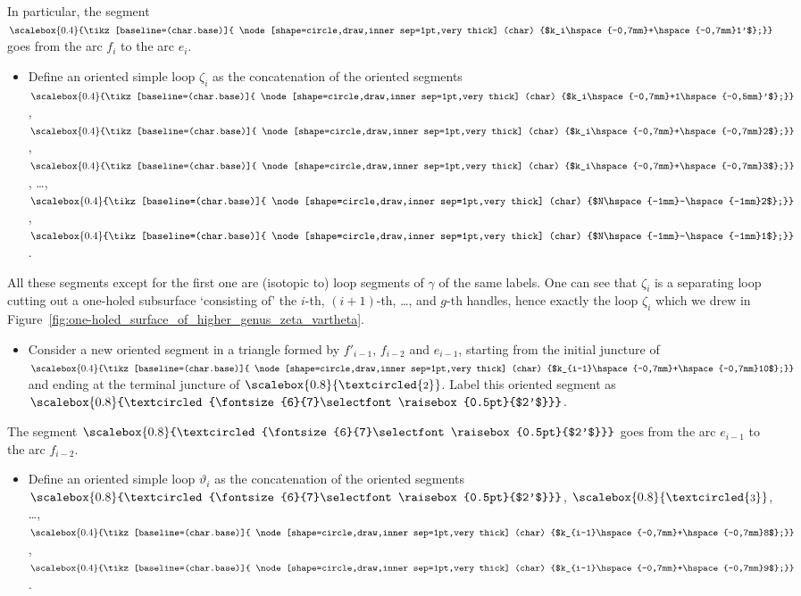 \documentclass[pdftex]{sigma}
\numberwithin{equation}{section}
\theoremstyle{definition}
\newcommand{\circled}[1]{\scalebox{0.8}{\textcircled{\fontsize{8}{9}\selectfont \raisebox{-0.1pt}{#1}}}}
\newcommand{\circledd}[1]{\scalebox{0.8}{\textcircled{\fontsize{6}{7}\selectfont \raisebox{0.5pt}{#1}}}}
\newcommand*\circleddd[1]{\scalebox{0.4}{\tikz[baseline=(char.base)]{
 \node[shape=circle,draw,inner sep=1pt,very thick] (char) {#1};}}}
\begin{document}
In particular, the segment $\circleddd{$k_i\hspace{-0,7mm}+\hspace{-0,7mm}1'$}$ goes from the arc $f_i$ to the arc $e_i$.
\begin{itemize}\itemsep=0pt
\item Define an oriented simple loop $\zeta_i$ as the concatenation of the oriented segments $\circleddd{$k_i\hspace{-0,7mm}+1\hspace{-0,5mm}'$}$, $\circleddd{$k_i\hspace{-0,7mm}+\hspace{-0,7mm}2$}$, $\circleddd{$k_i\hspace{-0,7mm}+\hspace{-0,7mm}3$}$, \dots, $\circleddd{$N\hspace{-1mm}-\hspace{-1mm}2$}$, $\circleddd{$N\hspace{-1mm}-\hspace{-1mm}1$}$.
\end{itemize}
All these segments except for the first one are (isotopic to) loop segments of $\gamma$ of the same labels. One can see that $\zeta_i$ is a separating loop cutting out a one-holed subsurface `consisting of' the $i$-th, $(i+1)$-th, \dots, and $g$-th handles, hence exactly the loop $\zeta_i$ which we drew in Figure~\ref{fig:one-holed_surface_of_higher_genus_zeta_vartheta}.
\begin{itemize}\itemsep=0pt
\item Consider a new oriented segment in a triangle formed by $f'_{i-1}$, $f_{i-2}$ and $e_{i-1}$, starting from the initial juncture of $\circleddd{$k_{i-1}\hspace{-0,7mm}+\hspace{-0,7mm}10$}$ and ending at the terminal juncture of $\circled{2}$. Label this oriented segment as $\circledd{$2'$}$.
\end{itemize}
The segment $\circledd{$2'$}$ goes from the arc $e_{i-1}$ to the arc $f_{i-2}$.
\begin{itemize}\itemsep=0pt
\item Define an oriented simple loop $\vartheta_i$ as the concatenation of the oriented segments $\circledd{$2'$}$, $\circled{3}$, \dots, $\circleddd{$k_{i-1}\hspace{-0,7mm}+\hspace{-0,7mm}8$}$, $\circleddd{$k_{i-1}\hspace{-0,7mm}+\hspace{-0,7mm}9$}$.
\end{itemize}
\end{document}
